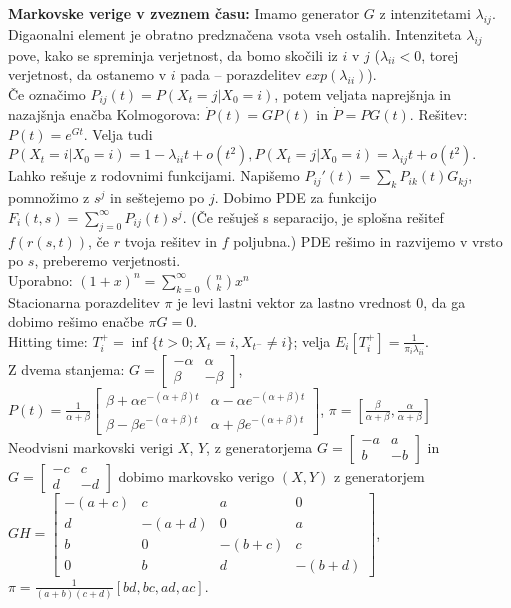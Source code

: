 \documentclass[a4paper, oneside, 12pt]{article}
\theoremstyle{definition}
\begin{document}
\textbf{Markovske verige v zveznem času:}
Imamo generator $G$ z intenzitetami $\lambda_{ij}$. Digaonalni element je obratno predznačena vsota vseh ostalih.
Intenziteta $\lambda_{ij}$ pove, kako se spreminja verjetnost, da bomo skočili iz $i$ v $j$
($\lambda_{ii} < 0$, torej verjetnost, da ostanemo v $i$ pada -- porazdelitev $exp(\lambda_{ii})$).\\
Če označimo $P_{ij}(t) = P(X_t = j|X_0 = i)$, potem veljata naprejšnja in nazajšnja enačba Kolmogorova:
$\dot{P}(t) = GP(t)$ in $\dot{P} = PG(t)$. Rešitev: $P(t) = e^{Gt}$. Velja tudi $P(X_t = i | X_0 = i) = 1 - \lambda_{ii} t + o(t^2), P(X_t = j | X_0 = i) = \lambda_{ij} t + o(t^2)$.\\
Lahko rešuje z rodovnimi funkcijami. Napišemo $P_{ij}'(t) = \sum_{k} P_{ik}(t)G_{kj}$,
pomnožimo z $s^j$ in seštejemo po $j$. Dobimo PDE za funkcijo $F_i(t, s) = \sum_{j=0}^{\infty} P_{ij}(t)s^j$. (Če rešuješ s separacijo, je splošna rešitef $f(r(s,t))$, če $r$ tvoja rešitev in $f$ poljubna.)
PDE rešimo in razvijemo v vrsto po $s$, preberemo verjetnosti.\\
Uporabno: $(1+x)^n = \sum_{k=0}^{\infty} \binom{n}{k}x^n$\\
Stacionarna porazdelitev $\pi$ je levi lastni vektor za lastno vrednost $0$, da ga dobimo rešimo
enačbe $\pi G = 0$.\\
Hitting time: $T_i^+=\inf\{t>0; X_t=i, X_{t^-}\neq i\}$; velja $E_i[T_i^+]=\frac{1}{\pi_i \lambda_{ii}}$.\\
Z dvema stanjema:
$G = \begin{bmatrix} -\alpha & \alpha\\ \beta & -\beta \end{bmatrix}$,
$P(t) = \frac{1}{\alpha+\beta} \begin{bmatrix}
  \beta + \alpha e^{-(\alpha+\beta)t} & \alpha - \alpha e^{-(\alpha+\beta)t} \\
  \beta - \beta e^{-(\alpha+\beta)t} & \alpha + \beta e^{-(\alpha+\beta)t} \end{bmatrix}$,
  $\pi = [\frac{\beta}{\alpha + \beta}, \frac{\alpha}{\alpha+\beta}]$\\
  Neodvisni markovski verigi $X$, $Y$, z generatorjema
  $G = \begin{bmatrix} -a & a\\ b & -b \end{bmatrix}$ in
  $G = \begin{bmatrix} -c & c\\ d & -d \end{bmatrix}$ dobimo markovsko verigo $(X,Y)$ z generatorjem
  $GH = \begin{bmatrix} - (a+c)& c & a & 0\\ d & -(a+d) & 0 & a \\ b & 0 & -(b+c) & c
  \\ 0 & b & d & -(b+d) \end{bmatrix}$, $\pi = \frac{1}{(a+b)(c+d)}[bd, bc, ad, ac]$.
\end{document}
